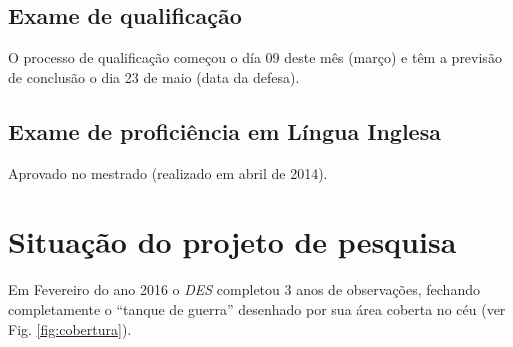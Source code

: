 \documentclass[a4paper, 11pt]{article}
\begin{document}
\subsection{Exame de qualifica\c{c}\~ao}

O processo de qualifica\c{c}\~ao come\c{c}ou o d\'ia 09 deste m\^es (mar\c{c}o) e t\^em a previs\~ao de conclus\~ao o dia 23 de maio (data da defesa).

\subsection{Exame de profici\^encia em L\'ingua Inglesa}

Aprovado no mestrado (realizado em abril de 2014).



\section{Situa\c{c}\~ao do projeto de pesquisa}

Em Fevereiro do ano 2016 o \textit{DES} completou 3 anos de observa\c{c}\~oes, fechando completamente o ``tanque de guerra'' desenhado por sua \'area coberta no c\'eu (ver Fig. \ref{fig:cobertura}).
\end{document}
